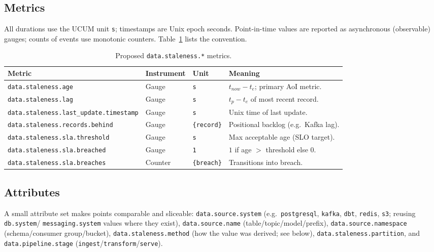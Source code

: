 \documentclass[11pt]{article}
\begin{document}
\subsection{Metrics}
All durations use the UCUM unit \texttt{s}; timestamps are Unix epoch seconds.
Point-in-time values are reported as asynchronous (observable) gauges; counts of
events use monotonic counters. Table~\ref{tab:metrics} lists the convention.

\begin{table}[t]
\centering
\caption{Proposed \texttt{data.staleness.*} metrics.}
\label{tab:metrics}
\footnotesize
\begin{tabular}{lllp{5.4cm}}
\toprule
Metric & Instrument & Unit & Meaning \\
\midrule
\texttt{data.staleness.age} & Gauge & \texttt{s} & \(t_{now}-t_e\); primary AoI metric. \\
\texttt{data.staleness.lag} & Gauge & \texttt{s} & \(t_p-t_e\) of most recent record. \\
\texttt{data.staleness.last\_update.timestamp} & Gauge & \texttt{s} & Unix time of last update. \\
\texttt{data.staleness.records.behind} & Gauge & \texttt{\{record\}} & Positional backlog (e.g.\ Kafka lag). \\
\texttt{data.staleness.sla.threshold} & Gauge & \texttt{s} & Max acceptable age (SLO target). \\
\texttt{data.staleness.sla.breached} & Gauge & \texttt{1} & \(1\) if age \(>\) threshold else \(0\). \\
\texttt{data.staleness.sla.breaches} & Counter & \texttt{\{breach\}} & Transitions into breach. \\
\bottomrule
\end{tabular}
\end{table}

\subsection{Attributes}
A small attribute set makes points comparable and sliceable:
\texttt{data.source.system} (e.g.\ \texttt{postgresql}, \texttt{kafka},
\texttt{dbt}, \texttt{redis}, \texttt{s3}; reusing \texttt{db.system}/
\texttt{messaging.system} values where they exist),
\texttt{data.source.name} (table/topic/model/prefix),
\texttt{data.source.namespace} (schema/consumer group/bucket),
\texttt{data.staleness.method} (how the value was derived; see below),
\texttt{data.staleness.partition}, and \texttt{data.pipeline.stage}
(\texttt{ingest}/\texttt{transform}/\texttt{serve}).
\end{document}
